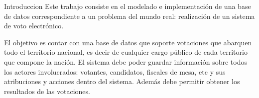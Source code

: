 \begin{section}{Introduccion}
Este trabajo consiste en el modelado e implementación de una base de datos correspondiente a un problema del mundo real: realización de un sistema de voto electrónico.

El objetivo es contar con una base de datos que soporte votaciones que abarquen todo el territorio nacional, es decir de cualquier cargo público de cada territorio que compone la nación. El sistema debe poder guardar informaci\'on sobre todos los actores involucrados: votantes, candidatos, fiscales de mesa, etc y sus atribuciones y acciones dentro del sistema. Además debe permitir obtener los resultados de las votaciones.
\end{section}